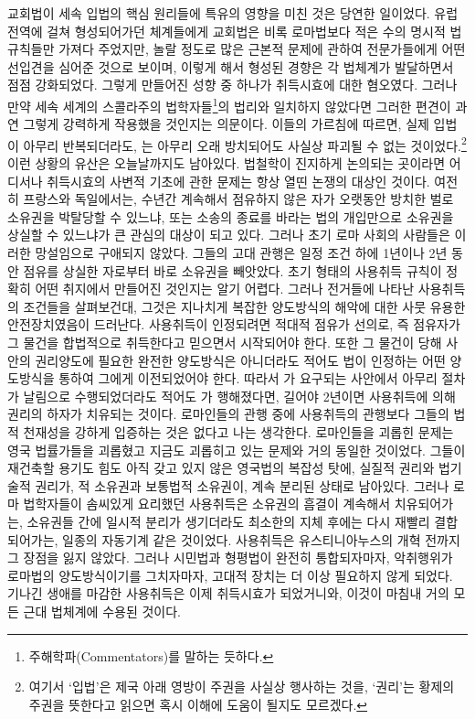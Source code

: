 교회법이 세속 입법의
핵심 원리들에 특유의 영향을 미친 것은 당연한 일이었다.
유럽 전역에 걸쳐 형성되어가던  체계들에게 교회법은
비록 로마법보다 적은 수의 명시적 법규칙들만 가져다 주었지만,
놀랄 정도로 많은 근본적 문제에 관하여
전문가들에게 어떤 선입견을 심어준 것으로 보이며,
이렇게 해서 형성된 경향은 각 법체계가 발달하면서 점점 강화되었다.
그렇게 만들어진 성향 중 하나가 취득시효에 대한 혐오였다.
그러나 만약
세속 세계의
스콜라주의 법학자들\footnote{%
  주해학파(Commentators)를 말하는 듯하다.
}의
법리와 일치하지 않았다면
그러한 편견이
과연 그렇게 강력하게 작용했을 것인지는 의문이다.
이들의 가르침에 따르면,
실제 입법이 아무리 반복되더라도,
는 아무리 오래 방치되어도
사실상 파괴될 수 없는 것이었다.\footnote{%
  여기서 `입법'은 제국 아래 영방이 주권을 사실상 행사하는 것을,
  `권리'는 황제의 주권을 뜻한다고 읽으면 혹시 이해에 도움이 될지도 모르겠다.
  }
이런 상황의 유산은 오늘날까지도 남아있다.
법철학이 진지하게 논의되는 곳이라면 어디서나
취득시효의 사변적 기초에 관한 문제는 항상 열띤 논쟁의 대상인 것이다.
여전히 프랑스와 독일에서는,
수년간 계속해서 점유하지 않은 자가
오랫동안 방치한 벌로
소유권을 박탈당할 수 있느냐,
또는 소송의 종료를 바라는 법의 개입만으로
소유권을 상실할 수 있느냐가
큰 관심의 대상이 되고 있다.
그러나 초기 로마 사회의 사람들은 이러한 망설임으로 구애되지 않았다.
그들의 고대 관행은
일정 조건 하에 1년이나 2년 동안 점유를 상실한 자로부터
바로 소유권을 빼앗았다.
초기 형태의 사용취득 규칙이 정확히 어떤 취지에서 만들어진 것인지는
알기 어렵다.
그러나 전거들에 나타난 사용취득의 조건들을 살펴보건대,
그것은 지나치게 복잡한 양도방식의 해악에 대한 사뭇 유용한 안전장치였음이
드러난다.
사용취득이 인정되려면
적대적 점유가 선의로,
즉 점유자가 그 물건을 합법적으로 취득한다고 믿으면서
시작되어야 한다.
또한 그 물건이
당해 사안의 권리양도에 필요한 완전한 양도방식은 아니더라도
적어도 법이 인정하는
어떤 양도방식을 통하여 그에게 이전되었어야 한다.
따라서 가 요구되는 사안에서
아무리 절차가 날림으로 수행되었더라도
적어도 가 행해졌다면,
길어야 2년이면 사용취득에 의해 권리의 하자가 치유되는 것이다.
로마인들의 관행 중에 사용취득의 관행보다
그들의 법적 천재성을 강하게 입증하는 것은 없다고 나는 생각한다.
로마인들을 괴롭힌 문제는 영국 법률가들을 괴롭혔고
지금도 괴롭히고 있는 문제와 거의 동일한 것이었다.
그들이 재건축할 용기도 힘도 아직 갖고 있지 않은
영국법의 복잡성 탓에,
실질적 권리와 법기술적 권리가,
적 소유권과 보통법적 소유권이,
계속 분리된 상태로 남아있다.
그러나 로마 법학자들이 솜씨있게 요리했던 사용취득은
소유권의 흠결이 계속해서 치유되어가는,
소유권들 간에 일시적 분리가 생기더라도
최소한의 지체 후에는 다시 재빨리 결합되어가는,
일종의 자동기계 같은 것이었다.
사용취득은 유스티니아누스의 개혁 전까지
그 장점을 잃지 않았다.
그러나 시민법과 형평법이 완전히 통합되자마자,
악취행위가 로마법의 양도방식이기를 그치자마자,
고대적 장치는 더 이상 필요하지 않게 되었다.
기나긴 생애를 마감한
사용취득은
이제
취득시효가 되었거니와,
이것이 마침내 거의 모든 근대 법체계에 수용된 것이다.

